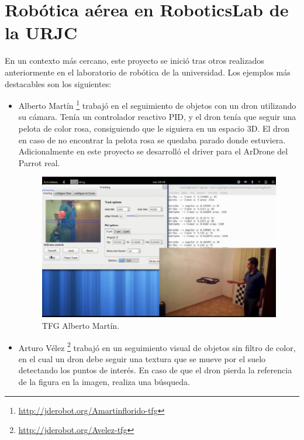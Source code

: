 \section{Robótica aérea en RoboticsLab de la URJC}
En un contexto más cercano, este proyecto se inició tras otros realizados
anteriormente en el laboratorio de robótica de la universidad. Los ejemplos más
destacables son los siguientes:
\begin{itemize}
\item Alberto Martín\cite{albertoMartin} \footnote{\url{http://jderobot.org/Amartinflorido-tfg}} trabajó en el seguimiento de objetos con un dron
utilizando su cámara. Tenía un controlador reactivo PID, y el dron tenía que seguir una pelota de color rosa, consiguiendo que le siguiera en un espacio 3D. El dron en caso de no encontrar la pelota rosa se quedaba parado donde estuviera. Adicionalmente en este proyecto se desarrolló el driver para el ArDrone del Parrot real.

\begin{figure}[H]
  \centering
  \includegraphics[scale=0.8]{imagenes/AlbertoMartin.png}
  \caption{TFG Alberto Martín.}
  \label{fig:albertoMartin}
\end{figure}


\item Arturo Vélez\cite{arturoVelez} \footnote{\url{http://jderobot.org/Avelez-tfg}} trabajó en un seguimiento visual de objetos sin filtro de color, en el cual un dron debe seguir una textura que se mueve por el suelo detectando los puntos de interés. En caso de que el dron pierda la referencia de la figura en la imagen, realiza una búsqueda.


\end{itemize}

